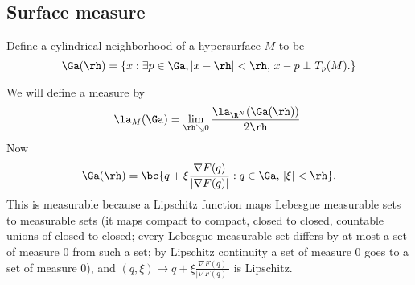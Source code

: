 
\subsection{Surface measure}
\begin{df}
Define a cylindrical neighborhood of a hypersurface $M$ to be
\[
\Ga(\rh)=\{x:\exists p\in \Ga,|x-\rh|<\rh,\,x-p\perp T_p(M).\}
\]
\end{df}

We will define a measure by
\[
\la_M(\Ga)=\lim_{\rh\searrow 0} \frac{\la_{\R^N}(\Ga(\rh))}{2\rh}.
\]
Now %
\[
\Ga(\rh)=\bc{q+\xi\frac{\nabla F(q)}{|\nabla F(q)|}:q\in \Ga,\,|\xi|<\rh}.
\]
This is measurable because a Lipschitz function maps Lebesgue measurable sets to measurable sets (it maps compact to compact, closed to closed, countable unions of closed to closed; every Lebesgue measurable set differs by at most a set of measure 0 from such a set; by Lipschitz continuity a set of measure 0 goes to a set of measure 0), and $(q,\xi)\mapsto q+\xi\frac{\nabla F(q)}{|\nabla F(q)|}$ is Lipschitz.

